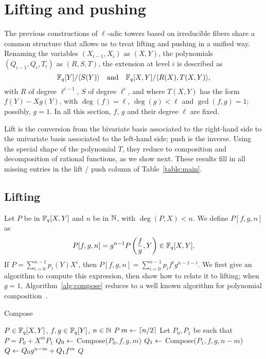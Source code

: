 \documentclass{sig-alternate}
\begin{document}
\section{Lifting and pushing}
\label{sec:lift-push}

The previous constructions of $\ell$-adic towers based on irreducible
fibers share a common structure that allows us to treat lifting and
pushing in a unified way. Renaming the variables $(X_{i-1},X_i)$ as
$(X,Y)$, the polynomials $(Q_{i-1},Q_i,T_i)$ as $(R,S,T)$, the
extension at level $i$ is described as
$$\mathbb{F}_q[Y]/ \langle S(Y) \rangle \quad\text{and}\quad \mathbb{F}_q[X,Y]/\langle
R(X), T(X,Y) \rangle,$$ with $R$ of degree $\ell^{i-1}$, $S$ of degree
$\ell^i$, and where $T(X,Y)$ has the form $f(Y)-X g(Y)$, with $\deg(f)
=\ell$, $\deg(g) < \ell$ and $\gcd(f,g)=1$; possibly, $g=1$. In all
this section, $f$, $g$ and their degree $\ell$ are fixed.

Lift is the conversion from the bivariate basis associated to the
right-hand side to the univariate basis associated to the left-hand side;
push is the inverse. Using the special shape of the polynomial $T$,
they reduce to composition and decomposition of rational functions, as
we show next. These results fill in all missing entries in the lift / push 
column of Table~\ref{table:main}.



\subsection{Lifting}

Let $P$ be in $\mathbb{F}_q[X,Y]$ and $n$ be in $\mathbb{N}$, with $\deg(P,X)< n$. We
define $P[f,g,n]$ as
$$P[f,g,n] = g^{n-1} P\left (\frac fg, Y\right) \in \mathbb{F}_q[X,Y].$$ If
$P=\sum_{i=0}^{n-1} p_i(Y) X^i$, then $P[f,g,n] = \sum_{i=0}^{n-1}
p_if^ig^{n-1-i}$.  We first give an algorithm to compute this
expression, then show how to relate it to lifting; when $g=1$,
Algorithm~\ref{alg:compose} reduces to a well known algorithm for
polynomial composition~\cite[Ex.~9.20]{vzGG}.

\begin{algorithm}[t]
  \caption{Compose}
  \label{alg:compose}
  \begin{algorithmic}[1]
    \REQUIRE $P\in \mathbb{F}_q[X,Y]$, $f,g\in \mathbb{F}_q[Y]$, $n\in\mathbb{N}$
    \RETURN $P$
    \ELSE
    \STATE $m \leftarrow \lceil n/2\rceil$
    \STATE Let $P_0,P_1$ be such that $P = P_0 + X^mP_1$
    \STATE $Q_0 \leftarrow$ Compose($P_0, f, g, m$)
    \STATE $Q_1 \leftarrow$ Compose($P_1, f, g, n-m$)
    \STATE $Q \leftarrow Q_0g^{n-m} + Q_1f^m$  \label{alg:compose:res}
    \RETURN $Q$
    \ENDIF
  \end{algorithmic}
\end{algorithm}
\end{document}

